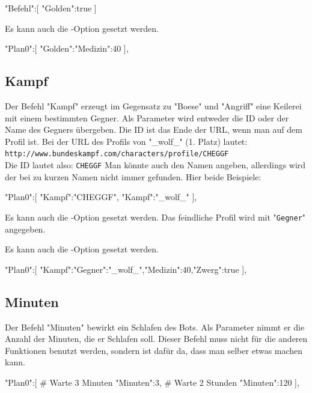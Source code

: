 \documentclass{scrartcl}
\begin{document}
\begin{code}[language=bash]
{"Befehl":[
	{"Golden":true}
]}
\end{code}


Es kann auch die -Option gesetzt werden.

\begin{code}[language=bash]
"Plan0":[
	{"Golden":{"Medizin":40}}
],
\end{code}

\subsection{Kampf}
\label{Kampf}
Der Befehl "Kampf" erzeugt im Gegensatz zu "Boese" und "Angriff" eine Keilerei mit einem bestimmten Gegner. Als Parameter wird entweder die ID oder der Name des Gegners übergeben. Die ID ist das Ende der URL, wenn man auf dem Profil ist. Bei der URL des Profils von "\_wolf\_" (1. Platz) lautet:\\
\texttt{http://www.bundeskampf.com/characters/profile/CHEGGF}\\
Die ID lautet also: \texttt{CHEGGF}
Man könnte auch den Namen angeben, allerdings wird der bei zu kurzen Namen nicht immer gefunden. Hier beide Beispiele:

\begin{code}[language=bash]
"Plan0":[
	{"Kampf":"CHEGGF"},
	{"Kampf":"_wolf_"}
],
\end{code}

Es kann auch die -Option gesetzt werden. Das feindliche Profil wird mit "\texttt{Gegner}" angegeben.

Es kann auch die -Option gesetzt werden.

\begin{code}[language=bash]
"Plan0":[
	{"Kampf":{"Gegner":"_wolf_","Medizin":40,"Zwerg":true}}
],
\end{code}

\subsection{Minuten}
Der Befehl "Minuten" bewirkt ein Schlafen des Bots. Als Parameter nimmt er die Anzahl der Minuten, die er Schlafen soll. Dieser Befehl muss nicht für die anderen Funktionen benutzt werden, sondern ist dafür da, dass man selber etwas machen kann.

\begin{code}[language=bash]
"Plan0":[
# Warte 3 Minuten
	{"Minuten":3},
# Warte 2 Stunden
	{"Minuten":120}
],
\end{code}
\end{document}
